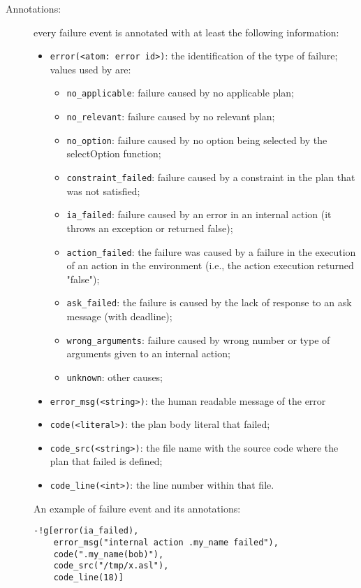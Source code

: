 \documentclass{article}
\begin{document}
\begin{description}
\begin{description}
\item[Annotations:] every failure event is annotated with at least the
  following information:
  \begin{itemize}
  \item \texttt{error(<atom: error id>)}: the identification of the type of
    failure; values used by \Jason are:
    \begin{itemize}
    \item \texttt{no\_applicable}: failure caused by no applicable plan;
    \item \texttt{no\_relevant}: failure caused by no relevant plan;
    \item \texttt{no\_option}: failure caused by no option being selected by
      the selectOption function;
    \item \texttt{constraint\_failed}: failure caused by a constraint in the
      plan that was not satisfied;
    \item \texttt{ia\_failed}: failure caused by an error in an internal
      action (it throws an exception or returned false);
    \item \texttt{action\_failed}: the failure was caused by a failure
      in the execution of an action in the environment (i.e., the
      action execution returned "false");
    \item \texttt{ask\_failed}: the failure is caused by the lack of response
      to an ask message (with deadline);
    \item \texttt{wrong\_arguments}: failure caused by wrong number or
      type of arguments given to an internal action;
    \item \texttt{unknown}: other causes;
    \end{itemize}

  \item \texttt{error\_msg(<string>)}: the human readable message of the error
  \item \texttt{code(<literal>)}: the plan body literal that failed;
  \item \texttt{code\_src(<string>)}: the file name with the source
    code where the plan that failed is defined;
  \item \texttt{code\_line(<int>)}: the line number within that file.
  \end{itemize}

  An example of failure event and its annotations:
\begin{verbatim}
-!g[error(ia_failed), 
    error_msg("internal action .my_name failed"), 
    code(".my_name(bob)"), 
    code_src("/tmp/x.asl"), 
    code_line(18)]
\end{verbatim}
  

\end{description}
\end{description}
\end{document}
